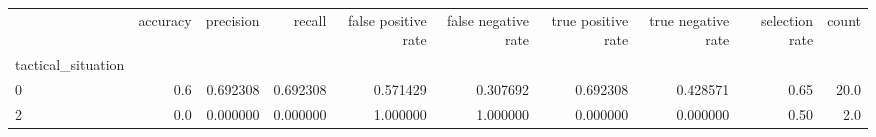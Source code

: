 \begin{tabular}{lrrrrrrrrr}
\toprule
{} &  accuracy &  precision &    recall &  false positive rate &  false negative rate &  true positive rate &  true negative rate &  selection rate &  count \\
tactical\_situation &           &            &           &                      &                      &                     &                     &                 &        \\
\midrule
0                  &       0.6 &   0.692308 &  0.692308 &             0.571429 &             0.307692 &            0.692308 &            0.428571 &            0.65 &   20.0 \\
2                  &       0.0 &   0.000000 &  0.000000 &             1.000000 &             1.000000 &            0.000000 &            0.000000 &            0.50 &    2.0 \\
\bottomrule
\end{tabular}
